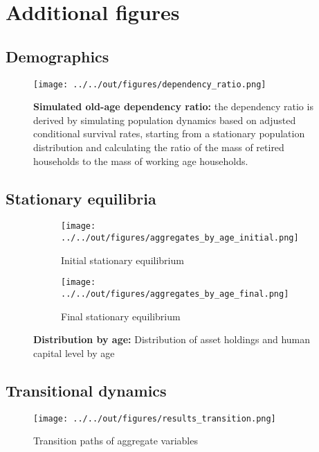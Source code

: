 \section{Additional figures}
\label{sec:figures}

\subsection{Demographics}

\begin{figure}[H]
    \texttt{[image: ../../out/figures/dependency\_ratio.png]}
    \caption{\textbf{Simulated old-age dependency ratio:} the dependency ratio is derived by simulating population dynamics based on adjusted conditional survival rates, starting from a stationary population distribution and calculating the ratio of the mass of retired households to the mass of working age households.}
    \label{fig:OADR}
\end{figure}

\subsection{Stationary equilibria}

\begin{figure}[H]
    \centering
    \begin{subfigure}[b]{0.45\textwidth}
        \centering
        \texttt{[image: ../../out/figures/aggregates\_by\_age\_initial.png]}
        \caption{Initial stationary equilibrium}
        \label{fig:aggregates_by_age_initial}
    \end{subfigure}
    \hfill
    \begin{subfigure}[b]{0.45\textwidth}
        \centering
        \texttt{[image: ../../out/figures/aggregates\_by\_age\_final.png]}
        \caption{Final stationary equilibrium}
        \label{fig:aggregates_by_age_final}
    \end{subfigure}
    \caption{\textbf{Distribution by age:} Distribution of asset holdings and human capital level by age}
    \label{fig:aggregates_by_age}
\end{figure}

\subsection{Transitional dynamics}

\begin{figure}[H]
    \texttt{[image: ../../out/figures/results\_transition.png]}
    \caption{Transition paths of aggregate variables}
    \label{fig:transition_aggregates}
\end{figure}

